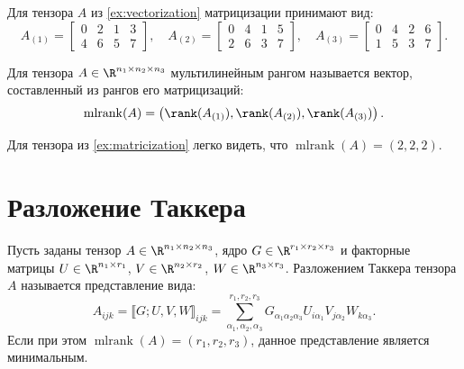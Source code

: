\begin{tcbexample}
\label{ex:matricization}
    Для тензора $A$ из \cref{ex:vectorization} матрицизации принимают вид:
    \[
        A_{(1)} = \begin{bmatrix} 0 & 2 & 1 & 3 \\ 4 & 6 & 5 & 7 \end{bmatrix}, \quad
        A_{(2)} = \begin{bmatrix} 0 & 4 & 1 & 5 \\ 2 & 6 & 3 & 7 \end{bmatrix}, \quad
        A_{(3)} = \begin{bmatrix} 0 & 4 & 2 & 6 \\ 1 & 5 & 3 & 7 \end{bmatrix}.
    \]
\end{tcbexample}

\begin{tcbdefinition}
\label{def:multilinear-rank}
    Для тензора $A \in \R^{n_1 \times n_2 \times n_3}$ мультилинейным рангом называется вектор, составленный из рангов его матрицизаций:
    \[
        \operatorname{mlrank}(A) = \left( \rank(A_{(1)}), \rank(A_{(2)}), \rank(A_{(3)}) \right).
    \]
\end{tcbdefinition}

Для тензора из \cref{ex:matricization} легко видеть, что $\operatorname{mlrank}(A) = (2, 2, 2)$.

\section{Разложение Таккера}
\label{sec:tucker-decomposition}

\begin{tcbdefinition}
\label{def:tucker}
    Пусть заданы тензор $A \in \R^{n_1 \times n_2 \times n_3}$, ядро $G \in \R^{r_1 \times r_2 \times r_3}$ и факторные матрицы $U \in \R^{n_1 \times r_1}$, $V \in \R^{n_2 \times r_2}$, $W \in \R^{n_3 \times r_3}$. Разложением Таккера тензора $A$ называется представление вида:
    \begin{equation}
        A_{ijk} = \llbracket G; U, V, W \rrbracket_{ijk} = \sum_{\alpha_1, \alpha_2, \alpha_3}^{r_1, r_2, r_3} G_{\alpha_1 \alpha_2 \alpha_3} U_{i \alpha_1} V_{j \alpha_2} W_{k \alpha_3}.
        \label{eq:tucker}
    \end{equation}
    Если при этом $\operatorname{mlrank}(A) = (r_1, r_2, r_3)$, данное представление является минимальным.
\end{tcbdefinition}

